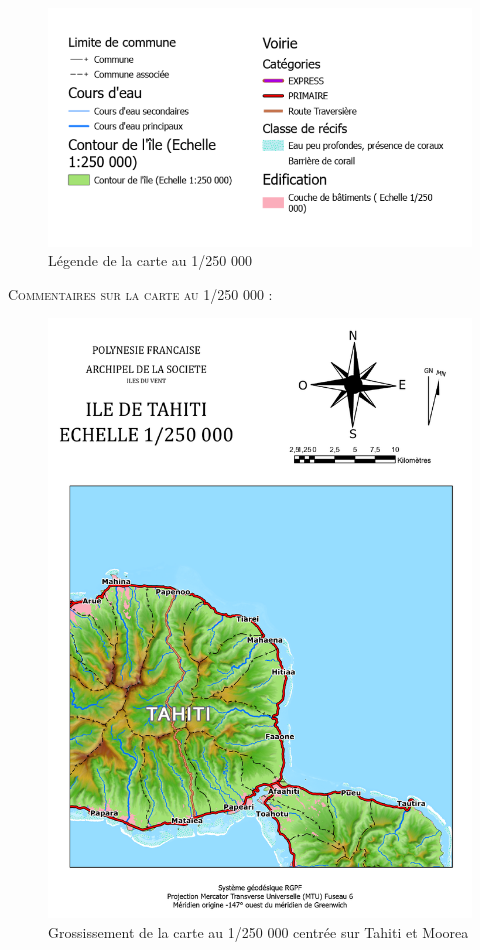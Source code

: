 \documentclass{themeensg}
\begin{document}
\begin{appendices}
\begin{figure}[!h]
\centering
\includegraphics[width=\linewidth]{images/Annexes/Resultat/legende_250.png}
\caption{Légende de la carte au 1/250 000}
\label{250 000_legende}
\end{figure}

\vspace{3cm}
\textsc{Commentaires sur la carte au 1/250 000 :}\\

\begin{figure}[!h]
\centering
\includegraphics[width=\linewidth]{images/Annexes/Resultat/Carte_250000_A4.pdf}
\caption{Grossissement de la carte au 1/250 000 centrée sur Tahiti et Moorea}
\label{250 000_gros}
\end{figure}


\end{appendices}
\end{document}
